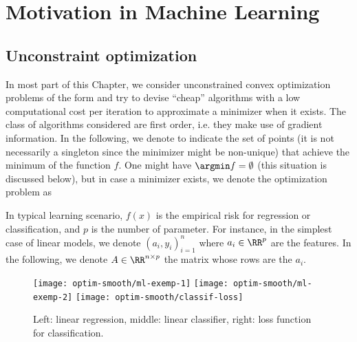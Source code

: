
\section{Motivation in Machine Learning}

\subsection{Unconstraint optimization}

In most part of this Chapter, we consider unconstrained convex optimization problems of the form 
and try to devise ``cheap'' algorithms with a low computational cost per iteration to approximate a minimizer when it exists. 
%
The class of algorithms considered are first order, i.e. they make use of gradient information. In the following, we denote 
to indicate the set of points (it is not necessarily a singleton since the minimizer might be non-unique) that achieve the minimum of the function $f$. One might have $\argmin f = \emptyset$ (this situation is discussed below), but in case a minimizer exists, we denote the optimization problem as


In typical learning scenario, $f(x)$ is the empirical risk for regression or classification, and $p$ is the number of parameter. For instance, in the simplest case of linear models, we denote $(a_i,y_i)_{i=1}^n$ where $a_i \in \RR^p$ are the features. 
%
In the following, we denote $A \in \RR^{n \times p}$ the matrix whose rows are the $a_i$.


\begin{figure}
\centering
\texttt{[image: optim-smooth/ml-exemp-1]} \quad
\texttt{[image: optim-smooth/ml-exemp-2]} \quad
\texttt{[image: optim-smooth/classif-loss]}
\caption{\label{fig-ml-ex}
Left: linear regression, middle: linear classifier, right: loss function for classification.
}
\end{figure}


